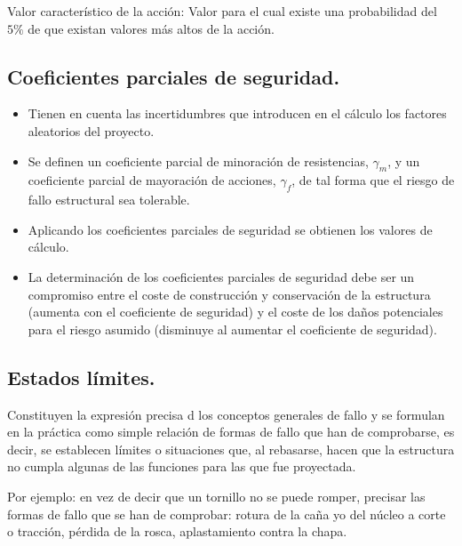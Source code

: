 Valor característico de la acción: Valor para el cual existe una probabilidad del $5\%$ de que existan valores más altos de la acción.

\subsection{Coeficientes parciales de seguridad.}
\begin{itemize}
    \item Tienen en cuenta las incertidumbres que introducen en el cálculo los factores aleatorios del proyecto.
    \item Se definen un coeficiente parcial de minoración de resistencias, $\gamma_m$, y un coeficiente parcial de mayoración de acciones, $\gamma_f$, de tal forma que el riesgo de fallo estructural sea tolerable.
    \item Aplicando los coeficientes parciales de seguridad se obtienen los valores de cálculo.
    \item La determinación de los coeficientes parciales de seguridad debe ser un compromiso entre el coste de construcción y conservación de la estructura (aumenta con el coeficiente de seguridad) y el coste de los daños potenciales para el riesgo asumido (disminuye al aumentar el coeficiente de seguridad).
\end{itemize}

\subsection{Estados límites.}
Constituyen la expresión precisa d los conceptos generales de fallo y se formulan en la práctica como simple relación de formas de fallo que han de comprobarse, es decir, se establecen límites o situaciones que, al rebasarse, hacen que la estructura no cumpla algunas de las funciones para las que fue proyectada.

Por ejemplo: en vez de decir que un tornillo no se puede romper, precisar las formas de fallo que se han de comprobar: rotura de la caña yo del núcleo a corte o tracción, pérdida de la rosca, aplastamiento contra la chapa.

